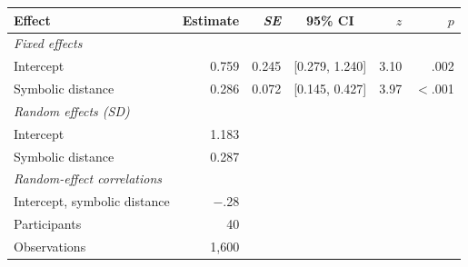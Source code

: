 \begin{tabular}{lrrcrr}
\toprule
Effect & Estimate & \textit{SE} & 95\% CI & $z$ & $p$ \\
\midrule
\multicolumn{6}{l}{\textit{Fixed effects}} \\
\quad Intercept & 0.759 & 0.245 & [0.279, 1.240] & 3.10 & .002 \\
\quad Symbolic distance & 0.286 & 0.072 & [0.145, 0.427] & 3.97 & $<$.001 \\
\multicolumn{6}{l}{\textit{Random effects (SD)}} \\
\quad Intercept & 1.183 \\
\quad Symbolic distance & 0.287 \\
\multicolumn{6}{l}{\textit{Random-effect correlations}} \\
\quad Intercept, symbolic distance & $-$.28 \\
\midrule
Participants & 40 \\
Observations & 1,600 \\
\bottomrule
\end{tabular}
